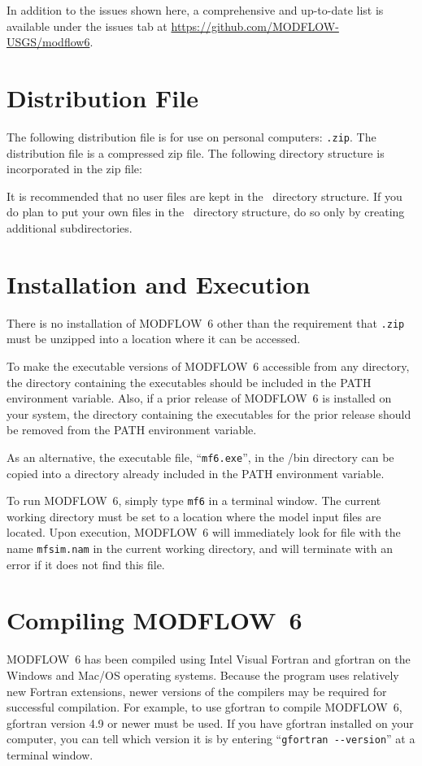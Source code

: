 \documentclass[11pt,twoside,twocolumn]{usgsreport}
\begin{document}
In addition to the issues shown here, a comprehensive and up-to-date list is available under the issues tab at \url{https://github.com/MODFLOW-USGS/modflow6}.


\section{Distribution File}
The following distribution file is for use on personal computers: \texttt{\modflowversion.zip}.  The distribution file is a compressed zip file. The following directory structure is incorporated in the zip file:



It is recommended that no user files are kept in the \modflowversion~directory structure.  If you do plan to put your own files in the \modflowversion~directory structure, do so only by creating additional subdirectories.

\section{Installation and Execution}
There is no installation of MODFLOW~6 other than the requirement that \texttt{\modflowversion.zip} must be unzipped into a location where it can be accessed.  

To make the executable versions of MODFLOW~6 accessible from any directory, the directory containing the executables should be included in the PATH environment variable.  Also, if a prior release of MODFLOW~6 is installed on your system, the directory containing the executables for the prior release should be removed from the PATH environment variable.

As an alternative, the executable file, ``\texttt{mf6.exe}'', in the \modflowversion{}/bin directory can be copied into a directory already included in the PATH environment variable.

To run MODFLOW~6, simply type \texttt{mf6} in a terminal window.  The current working directory must be set to a location where the model input files are located.  Upon execution, MODFLOW~6 will immediately look for file with the name \texttt{mfsim.nam} in the current working directory, and will terminate with an error if it does not find this file.

\section{Compiling MODFLOW~6}
MODFLOW~6 has been compiled using Intel Visual Fortran and gfortran on the Windows and Mac/OS operating systems.  Because the program uses relatively new Fortran extensions, newer versions of the compilers may be required for successful compilation.  For example, to use gfortran to compile MODFLOW~6, gfortran version 4.9 or newer must be used.  If you have gfortran installed on your computer, you can tell which version it is by entering ``\verb|gfortran --version|'' at a terminal window.
\end{document}

